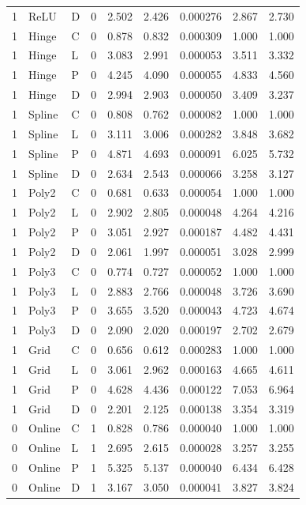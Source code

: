 \begin{longtable}{lllrrrrrr}
1 & ReLU & D & 0 & 2.502 & 2.426 & 0.000276 & 2.867 & 2.730 \\
1 & Hinge & C & 0 & 0.878 & 0.832 & 0.000309 & 1.000 & 1.000 \\
1 & Hinge & L & 0 & 3.083 & 2.991 & 0.000053 & 3.511 & 3.332 \\
1 & Hinge & P & 0 & 4.245 & 4.090 & 0.000055 & 4.833 & 4.560 \\
1 & Hinge & D & 0 & 2.994 & 2.903 & 0.000050 & 3.409 & 3.237 \\
1 & Spline & C & 0 & 0.808 & 0.762 & 0.000082 & 1.000 & 1.000 \\
1 & Spline & L & 0 & 3.111 & 3.006 & 0.000282 & 3.848 & 3.682 \\
1 & Spline & P & 0 & 4.871 & 4.693 & 0.000091 & 6.025 & 5.732 \\
1 & Spline & D & 0 & 2.634 & 2.543 & 0.000066 & 3.258 & 3.127 \\
1 & Poly2 & C & 0 & 0.681 & 0.633 & 0.000054 & 1.000 & 1.000 \\
1 & Poly2 & L & 0 & 2.902 & 2.805 & 0.000048 & 4.264 & 4.216 \\
1 & Poly2 & P & 0 & 3.051 & 2.927 & 0.000187 & 4.482 & 4.431 \\
1 & Poly2 & D & 0 & 2.061 & 1.997 & 0.000051 & 3.028 & 2.999 \\
1 & Poly3 & C & 0 & 0.774 & 0.727 & 0.000052 & 1.000 & 1.000 \\
1 & Poly3 & L & 0 & 2.883 & 2.766 & 0.000048 & 3.726 & 3.690 \\
1 & Poly3 & P & 0 & 3.655 & 3.520 & 0.000043 & 4.723 & 4.674 \\
1 & Poly3 & D & 0 & 2.090 & 2.020 & 0.000197 & 2.702 & 2.679 \\
1 & Grid & C & 0 & 0.656 & 0.612 & 0.000283 & 1.000 & 1.000 \\
1 & Grid & L & 0 & 3.061 & 2.962 & 0.000163 & 4.665 & 4.611 \\
1 & Grid & P & 0 & 4.628 & 4.436 & 0.000122 & 7.053 & 6.964 \\
1 & Grid & D & 0 & 2.201 & 2.125 & 0.000138 & 3.354 & 3.319 \\
0 & Online & C & 1 & 0.828 & 0.786 & 0.000040 & 1.000 & 1.000 \\
0 & Online & L & 1 & 2.695 & 2.615 & 0.000028 & 3.257 & 3.255 \\
0 & Online & P & 1 & 5.325 & 5.137 & 0.000040 & 6.434 & 6.428 \\
0 & Online & D & 1 & 3.167 & 3.050 & 0.000041 & 3.827 & 3.824 \\

\end{longtable}
